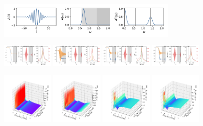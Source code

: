 \documentclass[a4paper]{article}
\begin{document}
\begin{figure}[H]
  \centering
  \includegraphics[width=0.8\textwidth]{A3.pdf}
\end{figure}
\begin{figure}[H]
  \centering
  \includegraphics[width=0.23\textwidth]{HL-A3-v5-imp0.pdf}
  \includegraphics[width=0.23\textwidth]{HL-A3-v5-imp1.pdf}
  \includegraphics[width=0.23\textwidth]{HL-A3-v5-imp2.pdf}
  \includegraphics[width=0.23\textwidth]{HL-A3-v5-imp3.pdf}
\end{figure}
\begin{figure}[H]
  \centering
  \includegraphics[width=0.23\textwidth]{cond3d_real-A3-v5-imp0.pdf}
  \includegraphics[width=0.23\textwidth]{cond3d_real-A3-v5-imp1.pdf}
  \includegraphics[width=0.23\textwidth]{cond3d_real-A3-v5-imp2.pdf}
  \includegraphics[width=0.23\textwidth]{cond3d_real-A3-v5-imp3.pdf}
\end{figure}
\end{document}
